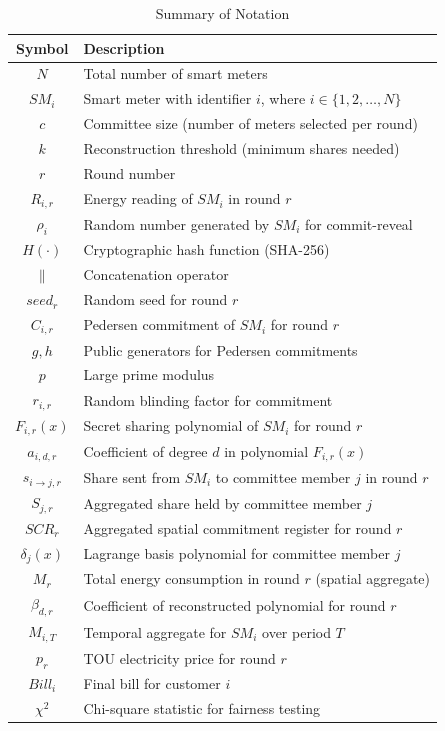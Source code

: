 \documentclass[conference]{IEEEtran}
\begin{document}
\begin{table}[h]
\centering
\caption{Summary of Notation}
\label{tab:notation}
\begin{tabular}{|c|l|}
\hline
\textbf{Symbol} & \textbf{Description} \\
\hline
$N$ & Total number of smart meters \\
$SM_i$ & Smart meter with identifier $i$, where $i \in \{1,2,\ldots,N\}$ \\
$c$ & Committee size (number of meters selected per round) \\
$k$ & Reconstruction threshold (minimum shares needed) \\
$r$ & Round number \\
$R_{i,r}$ & Energy reading of $SM_i$ in round $r$ \\
$\rho_i$ & Random number generated by $SM_i$ for commit-reveal \\
$H(\cdot)$ & Cryptographic hash function (SHA-256) \\
$\parallel$ & Concatenation operator \\
$seed_r$ & Random seed for round $r$ \\
$C_{i,r}$ & Pedersen commitment of $SM_i$ for round $r$ \\
$g, h$ & Public generators for Pedersen commitments \\
$p$ & Large prime modulus \\
$r_{i,r}$ & Random blinding factor for commitment \\
$F_{i,r}(x)$ & Secret sharing polynomial of $SM_i$ for round $r$ \\
$a_{i,d,r}$ & Coefficient of degree $d$ in polynomial $F_{i,r}(x)$ \\
$s_{i\to j,r}$ & Share sent from $SM_i$ to committee member $j$ in round $r$ \\
$S_{j,r}$ & Aggregated share held by committee member $j$ \\
$SCR_r$ & Aggregated spatial commitment register for round $r$ \\
$\delta_j(x)$ & Lagrange basis polynomial for committee member $j$ \\
$M_r$ & Total energy consumption in round $r$ (spatial aggregate) \\
$\beta_{d,r}$ & Coefficient of reconstructed polynomial for round $r$ \\
$M_{i,T}$ & Temporal aggregate for $SM_i$ over period $T$ \\
$p_r$ & TOU electricity price for round $r$ \\
$Bill_i$ & Final bill for customer $i$ \\
$\chi^2$ & Chi-square statistic for fairness testing \\
\hline
\end{tabular}
\end{table}
\end{document}
